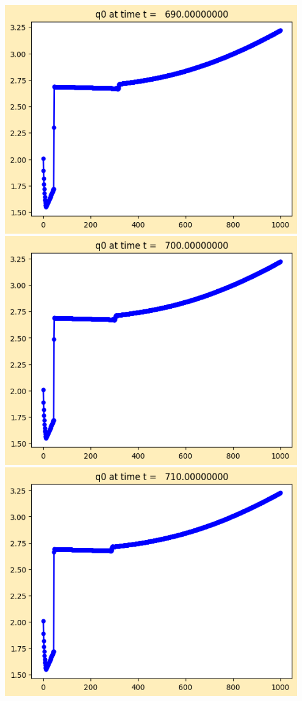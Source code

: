 \documentclass[11pt]{article}
\begin{document}
\vskip 10pt 
\includegraphics[width=0.95\textwidth]{frame0069fig1.png}
\vskip 10pt 
\includegraphics[width=0.95\textwidth]{frame0070fig1.png}
\vskip 10pt 
\includegraphics[width=0.95\textwidth]{frame0071fig1.png}
\end{document}
